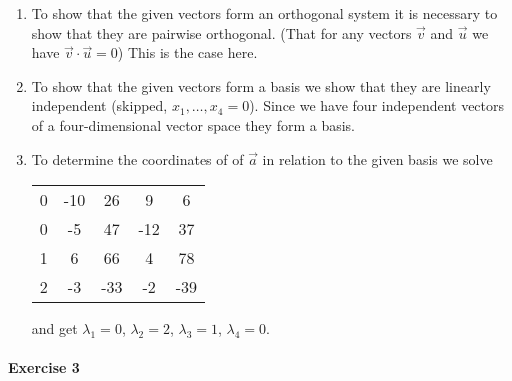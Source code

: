 \documentclass{article}
\begin{document}
\begin{enumerate}
    \item To show that the given vectors form an orthogonal system it is necessary to show that they are pairwise orthogonal. (That for any vectors $\vec{v}$ and $\vec{u}$ we have $\vec{v} \cdot \vec{u} = 0$) This is the case here.
    
    \item To show that the given vectors form a basis we show that they are linearly independent (skipped, $x_1, \ldots, x_4 = 0$). Since we have four independent vectors of a four-dimensional vector space they form a basis.
    
    \item To determine the coordinates of of $\vec{a}$ in relation to the given basis we solve
    \begin{center}
        \begin{tabular}{c c c c | c}
            0 & -10 & 26 & 9 & 6 \\
            0 & -5 & 47 & -12 & 37 \\
            1 & 6 & 66 & 4 & 78 \\
            2 & -3 & -33 & -2 & -39 \\
        \end{tabular}
    \end{center}
    and get $\lambda_1 = 0$, $\lambda_2 = 2$, $\lambda_3 = 1$, $\lambda_4 = 0$.
\end{enumerate}

\paragraph{Exercise 3}
\end{document}
